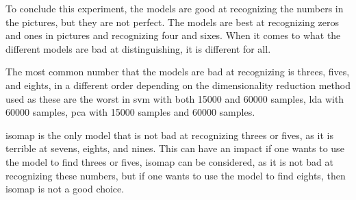 To conclude this experiment, the models are good at recognizing the numbers in the pictures, but they are not perfect. The models are best at recognizing zeros and ones in pictures and recognizing four and sixes. When it comes to what the different models are bad at distinguishing, it is different for all.

The most common number that the models are bad at recognizing is threes, fives, and eights, in a different order depending on the dimensionality reduction method used as these are the worst in \gls{svm} with both 15000 and 60000 samples, \gls{lda} with 60000 samples, \gls{pca} with 15000 samples and 60000 samples.

\gls{isomap} is the only model that is not bad at recognizing threes or fives, as it is terrible at sevens, eights, and nines. This can have an impact if one wants to use the model to find threes or fives, \gls{isomap} can be considered, as it is not bad at recognizing these numbers, but if one wants to use the model to find eights, then \gls{isomap} is not a good choice.
